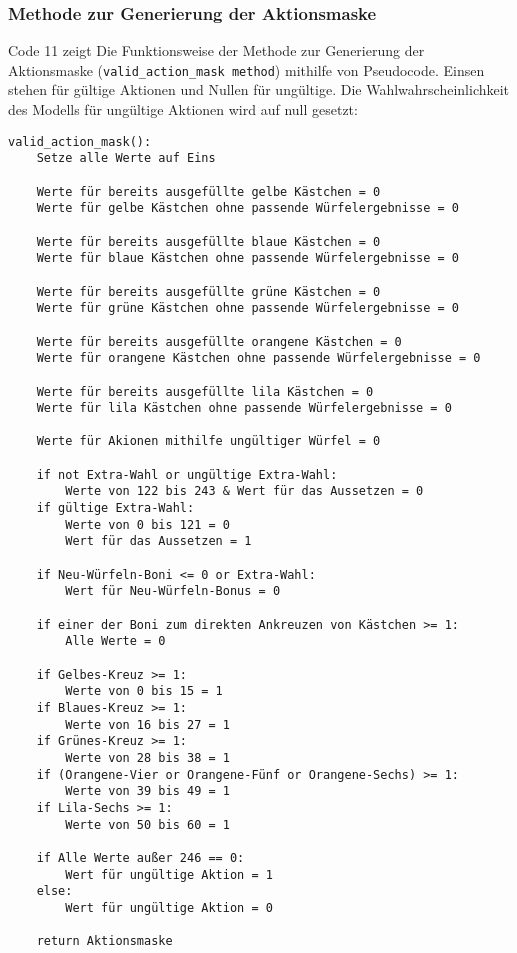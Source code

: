 \subsubsection{Methode zur Generierung der Aktionsmaske}
Code 11 zeigt Die Funktionsweise der Methode zur Generierung der Aktionsmaske (\texttt{valid\_action\_mask method}) mithilfe von Pseudocode. Einsen stehen für gültige Aktionen und Nullen für ungültige. Die Wahlwahrscheinlichkeit des Modells für ungültige Aktionen wird auf null gesetzt:
\vspace{0.5cm}
\begin{lstlisting}[caption={Methode zur Generierung der Aktionsmaske}]
valid_action_mask():
	Setze alle Werte auf Eins
	
	Werte für bereits ausgefüllte gelbe Kästchen = 0
	Werte für gelbe Kästchen ohne passende Würfelergebnisse = 0
	
	Werte für bereits ausgefüllte blaue Kästchen = 0
	Werte für blaue Kästchen ohne passende Würfelergebnisse = 0
	
	Werte für bereits ausgefüllte grüne Kästchen = 0
	Werte für grüne Kästchen ohne passende Würfelergebnisse = 0
	
	Werte für bereits ausgefüllte orangene Kästchen = 0
	Werte für orangene Kästchen ohne passende Würfelergebnisse = 0
	
	Werte für bereits ausgefüllte lila Kästchen = 0
	Werte für lila Kästchen ohne passende Würfelergebnisse = 0
	
	Werte für Akionen mithilfe ungültiger Würfel = 0
	
	if not Extra-Wahl or ungültige Extra-Wahl:
		Werte von 122 bis 243 & Wert für das Aussetzen = 0
	if gültige Extra-Wahl:
		Werte von 0 bis 121 = 0
		Wert für das Aussetzen = 1
	
	if Neu-Würfeln-Boni <= 0 or Extra-Wahl:
		Wert für Neu-Würfeln-Bonus = 0
	
	if einer der Boni zum direkten Ankreuzen von Kästchen >= 1:
		Alle Werte = 0
	
	if Gelbes-Kreuz >= 1:
		Werte von 0 bis 15 = 1
	if Blaues-Kreuz >= 1:
		Werte von 16 bis 27 = 1
	if Grünes-Kreuz >= 1:
		Werte von 28 bis 38 = 1
	if (Orangene-Vier or Orangene-Fünf or Orangene-Sechs) >= 1:
		Werte von 39 bis 49 = 1
	if Lila-Sechs >= 1:
		Werte von 50 bis 60 = 1
	
	if Alle Werte außer 246 == 0:
		Wert für ungültige Aktion = 1
	else:
		Wert für ungültige Aktion = 0
		
	return Aktionsmaske
\end{lstlisting}
